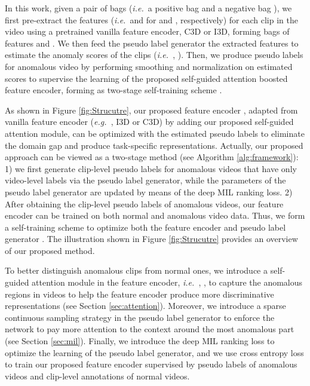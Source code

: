 \documentclass[final]{cvpr}
\newcommand{\ftst}{\textcolor[rgb]{0,0, 0}}
\newcommand{\ftnd}{\textcolor[rgb]{0.,0,0}}
\newcommand{\jcst}{\textcolor[rgb]{0,0,0}}
\newcommand{\jcnd}{\textcolor[rgb]{0,0.,0}}
\newcommand{\jcgam}{\textcolor[rgb]{0.,0.,0}}
\renewcommand{\eg}{\textit{e.g.\ }}
\renewcommand{\ie}{\textit{i.e.\ }}
\begin{document}
In this work, given a pair of bags (\ie a positive bag  and a negative bag ), we first pre-extract the features (\ie  and  for  and , respectively) for each clip in the video  using a pretrained vanilla feature encoder\jcst{, C3D or I3D, forming bags of features  and }. We then feed the pseudo label generator the extracted features to estimate the anomaly scores of the clips (\ie , ).
Then, we produce pseudo labels  for anomalous video by performing smoothing and normalization on estimated scores to supervise the learning of the \ftnd{proposed self-guided attention boosted feature encoder}, \jcgam{forming as two-stage self-training scheme} \cite{lee2013pseudo,zou2018unsupervised,zou2019confidence}. 


\ftnd{As shown in Figure \ref{fig:Strucutre}, our proposed feature encoder , adapted from vanilla feature encoder  (\eg, I3D or C3D) by adding our proposed self-guided attention module,} can be optimized with the estimated pseudo labels to eliminate the domain gap and produce task-specific representations. Actually, our proposed approach can be viewed as a two-stage method (see Algorithm \ref{alg:framework}): 1) we first generate clip-level pseudo labels for anomalous videos that have only video-level labels via the pseudo label generator, while the parameters of the pseudo label generator are updated by means of the deep MIL ranking loss. 2) After obtaining the clip-level pseudo labels of anomalous videos, our feature encoder  can be trained on both normal and anomalous video data. Thus, we form a self-training scheme to optimize both the feature encoder  and pseudo label generator . The illustration shown in Figure \ref{fig:Strucutre} provides an overview of our proposed method.

To better distinguish anomalous clips from normal ones, we introduce a self-guided attention module in the feature encoder, \ie, , to capture the anomalous regions in videos to help the feature encoder produce more discriminative representations (see Section \ref{sec:attention}). Moreover, we introduce a sparse continuous sampling strategy in the pseudo label generator to enforce
\jcnd{the network to pay more attention to the context around the most anomalous part}
(see Section \ref{sec:mil}). Finally, we introduce the deep MIL ranking loss to optimize the learning of the pseudo label generator, \ftst{and we use cross entropy loss to train our proposed feature encoder  supervised by pseudo labels of anomalous videos and clip-level annotations of normal videos.}
\vspace{-0.1cm}
\end{document}
